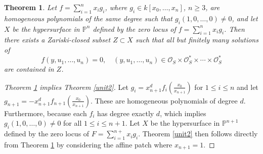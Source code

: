 \documentclass[10pt,a4paper]{amsart}
\newtheorem{theorem}{Theorem}
\begin{document}
\begin{theorem}\label{UnitCZ}
Let $f=\sum_{i=1}^n x_i g_i$, where $g_i \in k[x_0,\ldots,x_n]$, $n\ge 3$, are homogeneous polynomials of the same degree such that $g_i(1,0,\ldots,0)\ne 0$, and  let $X$  be the hypersurface  in $\mathbb P^n$ defined by the zero locus of  $f=\sum_{i=1}^nx_ig_i$.   Then there exists a Zariski-closed subset $Z \subset X$ such that all but finitely many solutions of
\[
f(y,u_1,\ldots,u_n)=0, \quad (y,u_1,\ldots,u_n)\in \mathcal O_S\times \mathcal O_S^*\times\cdots\times \mathcal O_S^*
\]
are contained in $Z$.
\end{theorem}

\begin{proof}[Theorem \ref{UnitCZ} implies  Theorem  \ref{unit2}]
Let $g_i=x_{n+1}^d f_i(\frac{x_0}{x_{n+1}})$ for $1\le i\le n$ and let $g_{n+1}= -x_{n+1}^d f_{n+1}(\frac{x_0}{x_{n+1}}) $. These are homogeneous polynomials of degree $d$.  Furthermore, because each $f_i$ has degree exactly $d$, which implies
 $g_i(1,0,\hdots,0)\ne 0$ for all  $1\le i\le n+1$.   Let $X$  be the hypersurface  in $\mathbb P^{n+1}$ defined by the zero locus of  $F=\sum_{i=1}^{n+}x_ig_i $.  Theorem  \ref{unit2} then follows directly from Theorem \ref{UnitCZ} by considering the affine patch where $x_{n+1}=1$.
\end{proof}
\end{document}
